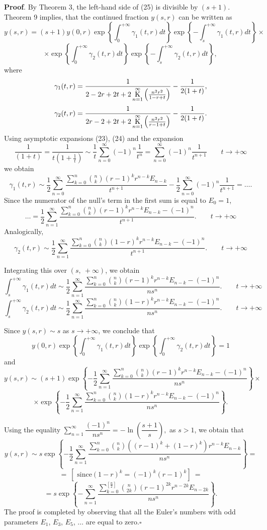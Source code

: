 \documentclass[a4paper,10pt]{article}      %
\newcommand{\K}{\operatornamewithlimits{K}}
\begin{document}
{\bf Proof}.
By Theorem 3, the left-hand side of (25) is divisible by $(s+1)$. Theorem 9 implies, that the continued fraction $y(s,r)$ can be written as
$$y(s,r) = (s+1)y(0,r) \exp\left\{\int_0^{+ \infty}\gamma_1(t,r)dt \right\}\exp\left\{-\int_s^{+ \infty}\gamma_1(t,r)dt \right\}\times$$ $$\times\exp\left\{\int_0^{+ \infty}\gamma_2(t,r)dt \right\}\exp\left\{-\int_s^{+ \infty}\gamma_2(t,r)dt \right\}, $$
where $$\gamma_1(t,r) = \dfrac{1}{2-2r+2t + 2\K\limits_{n=1}^\infty \left(\frac{n^2r^2}{1-r+t}\right)} - \dfrac{1}{2(1+t)},$$
$$\gamma_2(t,r) = \dfrac{1}{2r-2+2t + 2\K\limits_{n=1}^\infty \left(\frac{n^2r^2}{r-1+t}\right)} - \dfrac{1}{2(1+t)}.$$
Using asymptotic expansions (23), (24) and the expansion
$$\dfrac{1}{(1+t)} = \dfrac{1}{t(1+ \frac{1}{t})} \sim \dfrac{1}{t} \sum_{n=0}^{\infty}(-1)^n\frac{1}{t^n} =  \sum_{n=0}^{\infty}(-1)^n\frac{1}{t^{n+1}} \qquad t \rightarrow + \infty$$
 we obtain
$$\gamma_1(t,r) \sim \frac{1}{2}\sum_{n=0}^{\infty}\dfrac{\sum\limits_{k = 0}^{n}\binom{n}k (r-1)^k r^{n-k} E_{n-k} }{t^{n+1}} - \frac{1}{2}\sum_{n=0}^{\infty}(-1)^n\frac{1}{t^{n+1}} = \ldots.$$  Since the numerator of the null's term in the first sum is equal to $E_0 = 1$,
$$ \ldots =  \frac{1}{2}\sum_{n=1}^{\infty}\dfrac{\sum\limits_{k = 0}^{n}\binom{n}k (r-1)^k r^{n-k} E_{n-k} - (-1)^n}{t^{n+1}}. \qquad t \rightarrow + \infty$$
Analogically,
$$\gamma_2(t,r) \sim  \frac{1}{2}\sum_{n=1}^{\infty}\dfrac{\sum\limits_{k = 0}^{n}\binom{n}k (1-r)^k r^{n-k} E_{n-k} - (-1)^n}{t^{n+1}}. \qquad t \rightarrow + \infty$$

Integrating this over $(s, \ + \infty)$, we obtain
$$\int_s^{+ \infty} \gamma_1(t,r)dt \sim \frac{1}{2}\sum_{n=1}^{\infty}\dfrac{\sum\limits_{k = 0}^{n}\binom{n}k (r-1)^k r^{n-k} E_{n-k} - (-1)^n}{ns^{n}}. \qquad t \rightarrow + \infty$$
$$\int_s^{+ \infty} \gamma_2(t,r)dt \sim  \frac{1}{2}\sum_{n=1}^{\infty}\dfrac{\sum\limits_{k = 0}^{n}\binom{n}k (1-r)^k r^{n-k} E_{n-k} - (-1)^n}{ns^{n}}. \qquad t \rightarrow + \infty$$

Since $y(s,r) \sim s$ as $s \rightarrow + \infty$, we conclude that
$$ y(0,r) \exp\left\{\int_0^{+ \infty}\gamma_1(t,r)dt \right\}\exp\left\{\int_0^{+ \infty}\gamma_2(t,r)dt \right\} = 1$$
and
$$y(s,r) \sim (s+1)\exp\left\{- \frac{1}{2}\sum_{n=1}^{\infty}\dfrac{\sum\limits_{k = 0}^{n}\binom{n}k (r-1)^k r^{n-k} E_{n-k} - (-1)^n}{ns^{n}} \right\} \times $$ $$ \times \exp\left\{-\frac{1}{2}\sum_{n=1}^{\infty}\dfrac{\sum\limits_{k = 0}^{n}\binom{n}k (1-r)^k r^{n-k} E_{n-k} - (-1)^n}{ns^{n}} \right\}.$$

Using the equality $\sum\limits_{n=1}^{\infty} \dfrac{(-1)^n}{ns^n} = -\ln\left(\dfrac{s+1}{s}\right),$ as $s>1$, we obtain that
$$y(s,r) \sim s\exp\left\{- \frac{1}{2}\sum_{n=1}^{\infty}\dfrac{\sum\limits_{k = 0}^{n}\binom{n}k ((r-1)^k + (1-r)^k) r^{n-k} E_{n-k}}{ns^{n}} \right\} = $$
$$= \ [\mbox{ since} (1-r)^k = (-1)^k(r-1)^k] \ =$$
$$= s\exp\left\{- \sum_{n=1}^{\infty}\dfrac{\sum\limits_{k = 0}^{[\frac{n}{2}]}\binom{n}{2k} (r-1)^{2k} r^{n-2k} E_{n-2k}}{ns^{n}} \right\}.$$
The proof is completed by observing that all the Euler's numbers with odd parameters $E_1$, $E_3$, $E_5$, $\ldots$ are equal to zero.\hfill $\square$
\end{document}

